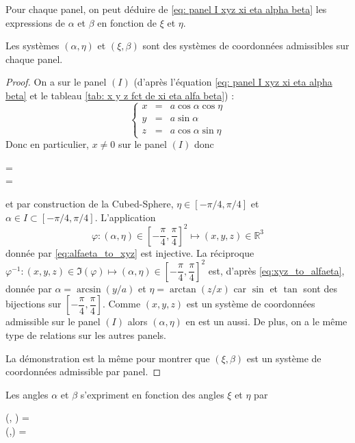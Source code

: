 Pour chaque panel, on peut déduire de \eqref{eq: panel I xyz xi eta alpha beta} les expressions de $\alpha$ et $\beta$ en fonction de $\xi$ et $\eta$. 

\begin{theoreme}
Les systèmes $(\alpha, \eta)$ et $(\xi, \beta)$ sont des systèmes de coordonnées admissibles sur chaque panel.
\end{theoreme} 

\begin{proof}
On a sur le panel $(I)$ (d'après l'équation \eqref{eq: panel I xyz xi eta alpha beta} et le tableau \ref{tab: x y z fct de xi eta alfa beta}) :
\begin{equation}
\left\lbrace
\begin{array}{rcl}
x & = & a \cos \alpha \cos \eta \\
y & = & a \sin \alpha \\
z & = & a \cos \alpha \sin \eta
\end{array}
\right.
\label{eq:alfaeta_to_xyz}
\end{equation}
Donc en particulier, $x \neq 0$ sur le panel $(I)$ donc
\begin{eqsys}
\tan \eta =  \\
\sin \alpha = 
\label{eq:xyz_to_alfaeta}
\end{eqsys}
et par construction de la Cubed-Sphere, $\eta \in [- \pi/4, \pi/4]$ et $\alpha \in I \subset[- \pi/4, \pi/4]$. L'application
\begin{equation}
\varphi : (\alpha, \eta) \in \left[ - \dfrac{\pi}{4}, \dfrac{\pi}{4} \right]^2 \mapsto (x,y,z) \in \mathbb{R}^3
\end{equation}
donnée par \eqref{eq:alfaeta_to_xyz} est injective. La réciproque $\varphi^{-1} : (x,y,z) \in \Im(\varphi) \mapsto (\alpha, \eta) \in \left[ - \dfrac{\pi}{4}, \dfrac{\pi}{4} \right]^2$ est, d'après \eqref{eq:xyz_to_alfaeta}, donnée par $\alpha = \arcsin (y/a)$ et $\eta = \arctan(z/x)$ car $\sin$ et $\tan$ sont des bijections sur $\left[ - \dfrac{\pi}{4}, \dfrac{\pi}{4} \right]$. Comme $(x,y,z)$ est un système de coordonnées admissible sur le panel $(I)$ alors $(\alpha, \eta)$ en est un aussi. De plus, on a le même type de relations sur les autres panels.

La démonstration est la même pour montrer que $(\xi, \beta)$ est un système de coordonnées admissible par panel.
\end{proof}


\begin{proposition}
Les angles $\alpha$ et $\beta$ s'expriment en fonction des angles $\xi$ et $\eta$ par
\begin{eqsys}
\alpha(\xi, \eta) = \arctan {} \\
\beta(\xi,\eta) = \arctan {} 
\label{eq: alpha et beta fct de xi et eta}
\end{eqsys}
\label{prop:alfa_beta_xi_eta}
\end{proposition}

